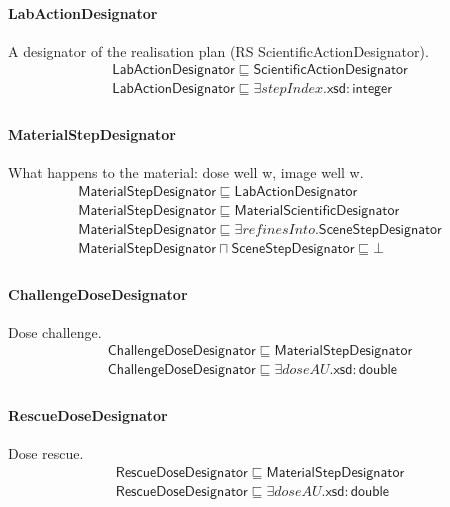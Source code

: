 \documentclass[10pt]{article}
\begin{document}
\paragraph{LabActionDesignator} A designator of the realisation plan (RS ScientificActionDesignator).
\[\begin{array}{l}
\mathsf{LabActionDesignator} \sqsubseteq  \mathsf{ScientificActionDesignator} \\
\mathsf{LabActionDesignator} \sqsubseteq  \exists \mathit{stepIndex}.\mathsf{xsd{:}integer} \\
\end{array}\]
\paragraph{MaterialStepDesignator} What happens to the material: dose well w, image well w.
\[\begin{array}{l}
\mathsf{MaterialStepDesignator} \sqsubseteq  \mathsf{LabActionDesignator} \\
\mathsf{MaterialStepDesignator} \sqsubseteq  \mathsf{MaterialScientificDesignator} \\
\mathsf{MaterialStepDesignator} \sqsubseteq  \exists \mathit{refinesInto}.\mathsf{SceneStepDesignator} \\
\mathsf{MaterialStepDesignator} \sqcap  \mathsf{SceneStepDesignator} \sqsubseteq  \bot  \\
\end{array}\]
\paragraph{ChallengeDoseDesignator} Dose challenge.
\[\begin{array}{l}
\mathsf{ChallengeDoseDesignator} \sqsubseteq  \mathsf{MaterialStepDesignator} \\
\mathsf{ChallengeDoseDesignator} \sqsubseteq  \exists \mathit{doseAU}.\mathsf{xsd{:}double} \\
\end{array}\]
\paragraph{RescueDoseDesignator} Dose rescue.
\[\begin{array}{l}
\mathsf{RescueDoseDesignator} \sqsubseteq  \mathsf{MaterialStepDesignator} \\
\mathsf{RescueDoseDesignator} \sqsubseteq  \exists \mathit{doseAU}.\mathsf{xsd{:}double} \\
\end{array}\]
\end{document}
